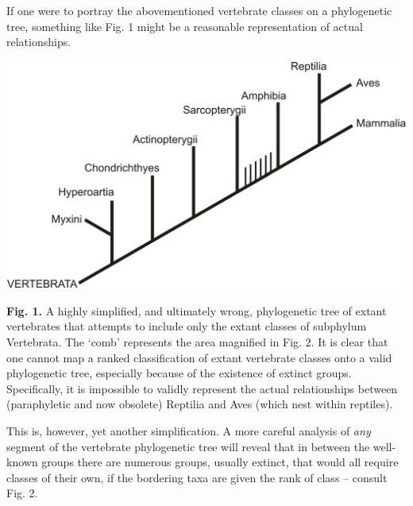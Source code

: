 \documentclass[a4paper]{article}
\begin{document}
If one were to portray the abovementioned vertebrate classes on a phylogenetic tree, something like Fig. 1 might be a
reasonable representation of actual relationships.

{\centering  \includegraphics{Lamzaorg-img001.pdf} \par}
\textbf{Fig. 1. }A highly simplified, and ultimately wrong, phylogenetic tree of extant vertebrates that attempts to
include only the extant classes of subphylum Vertebrata. The ‘comb’ represents the area magnified in Fig. 2. It is
clear that one cannot map a ranked classification of extant vertebrate classes onto a valid phylogenetic tree,
especially because of the existence of extinct groups. Specifically, it is impossible to validly represent the actual
relationships between (paraphyletic and now obsolete) Reptilia and Aves (which nest within reptiles).

This is, however, yet another simplification. A more careful analysis of \textit{any }segment of the vertebrate
phylogenetic tree will reveal that in between the well-known groups there are numerous groups, usually extinct, that
would all require classes of their own, if the bordering taxa are given the rank of class – consult Fig. 2.
\end{document}
